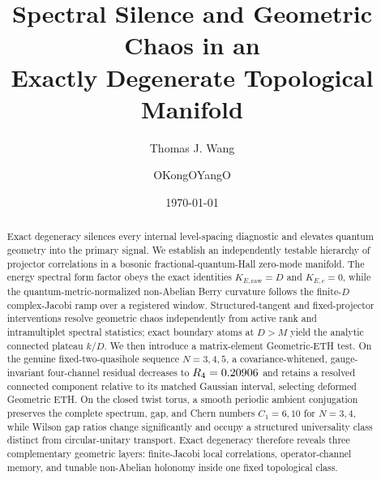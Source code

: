 \documentclass[aps,prb,reprint,superscriptaddress,longbibliography,floatfix]{revtex4-2}
\begin{document}
\title{Spectral Silence and Geometric Chaos in an\texorpdfstring{\\}{ }
Exactly Degenerate Topological Manifold}

\author{Thomas J. Wang}

\author{OKongOYangO}

\date{\today}

\begin{abstract}
Exact degeneracy silences every internal level-spacing diagnostic and elevates quantum geometry into the primary signal. We establish an independently testable hierarchy of projector correlations in a bosonic fractional-quantum-Hall zero-mode manifold. The energy spectral form factor obeys the exact identities \(K_{E,\mathrm{raw}}=D\) and \(K_{E,c}=0\), while the quantum-metric-normalized non-Abelian Berry curvature follows the finite-\(D\) complex-Jacobi ramp over a registered window. Structured-tangent and fixed-projector interventions resolve geometric chaos independently from active rank and intramultiplet spectral statistics; exact boundary atoms at \(D>M\) yield the analytic connected plateau \(k/D\). We then introduce a matrix-element Geometric-ETH test. On the genuine fixed-two-quasihole sequence \(N=3,4,5\), a covariance-whitened, gauge-invariant four-channel residual decreases to \(R_4=0.20906\) and retains a resolved connected component relative to its matched Gaussian interval, selecting deformed Geometric ETH. On the closed twist torus, a smooth periodic ambient conjugation preserves the complete spectrum, gap, and Chern numbers \(C_1=6,10\) for \(N=3,4\), while Wilson gap ratios change significantly and occupy a structured universality class distinct from circular-unitary transport. Exact degeneracy therefore reveals three complementary geometric layers: finite-Jacobi local correlations, operator-channel memory, and tunable non-Abelian holonomy inside one fixed topological class.
\end{abstract}

\maketitle









\end{document}
